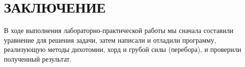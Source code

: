 \documentclass[14pt]{extarticle}
\begin{document}

\clearpage

\section{\MakeUppercase{Заключение}}

В ходе выполнения лабораторно-практической работы мы сначала составили уравнение для решения задачи, затем написали и отладили программу, реализующую методы дихотомии, хорд и грубой силы (перебора), и проверили полученный результат.
\end{document}
